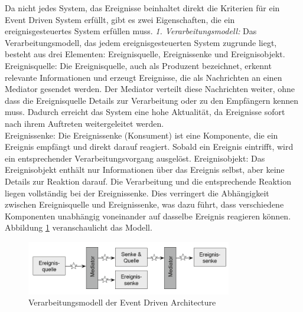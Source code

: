 \documentclass[a4paper,12pt]{article}
\begin{document}
Da nicht jedes System, das Ereignisse beinhaltet direkt die Kriterien für ein Event Driven System erfüllt, gibt es zwei Eigenschaften, die ein ereignisgesteuertes System erfüllen muss. \newline
\textit{1. Verarbeitungsmodell:} \newline
Das Verarbeitungsmodell, das jedem ereignisgesteuerten System zugrunde liegt, besteht aus drei Elementen: Ereignisquelle, Ereignissenke und Ereignisobjekt.\\
Ereignisquelle: Die Ereignisquelle, auch als Produzent bezeichnet, erkennt relevante Informationen und erzeugt Ereignisse, die als Nachrichten an einen Mediator gesendet werden. Der Mediator verteilt diese Nachrichten weiter, ohne dass die Ereignisquelle Details zur Verarbeitung oder zu den Empfängern kennen muss. Dadurch erreicht das System eine hohe Aktualität, da Ereignisse sofort nach ihrem Auftreten weitergeleitet werden.\\
Ereignissenke: Die Ereignissenke (Konsument) ist eine Komponente, die ein Ereignis empfängt und direkt darauf reagiert. Sobald ein Ereignis eintrifft, wird ein entsprechender Verarbeitungsvorgang ausgelöst.
Ereignisobjekt: Das Ereignisobjekt enthält nur Informationen über das Ereignis selbst, aber keine Details zur Reaktion darauf. Die Verarbeitung und die entsprechende Reaktion liegen vollständig bei der Ereignissenke. Dies verringert die Abhängigkeit zwischen Ereignisquelle und Ereignissenke, was dazu führt, dass verschiedene Komponenten unabhängig voneinander auf dasselbe Ereignis reagieren können. \cite[S. 51f]{Bruns2010} \newline
Abbildung \ref{fig:Verarbeitungsmodell} veranschaulicht das Modell. 

\begin{figure}[h]
    \centering
    \includegraphics[width=0.8\textwidth]{images/Verarbeitungsmodell.png}
    \caption{Verarbeitungsmodell der Event Driven Architecture \cite[S. 52]{Bruns2010}}
    \label{fig:Verarbeitungsmodell}
\end{figure}
\end{document}
